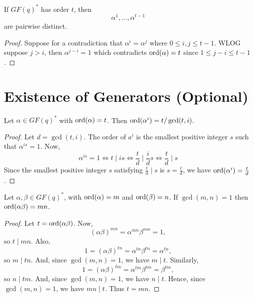 
\begin{thmbox}
    \begin{theorem}
        If $ GF(q)^* $ has order $ t $, then
        \[ \alpha^1,\ldots,\alpha^{t-1} \]
        are pairwise distinct.
    \end{theorem}
\end{thmbox}

\begin{proof}
    Suppose for a contradiction that $ \alpha^i=\alpha^j $ where $ 0\leqslant i,j\leqslant t-1 $.
    WLOG suppose $ j>i $, then $ \alpha^{j-i}=1 $ which contradicts $ \operatorname{ord}(\alpha)=t $
    since $ 1\leqslant j-i\leqslant t-1 $.
\end{proof}

\section{Existence of Generators (Optional)}

\begin{thmbox}
    \begin{lemma}
        Let $ \alpha\in GF(q)^* $ with $ \operatorname{ord}(\alpha)=t $. Then $ \operatorname{ord}(\alpha^i)=
            t/\gcd(t,i) $.
    \end{lemma}
\end{thmbox}

\begin{proof}
    Let $ d=\gcd(t,i) $. The order of $ a^i $ is the smallest positive
    integer $ s $ such that $ \alpha^{is}=1 $. Now,
    \[ \alpha^{is}=1\iff t\mid is\iff \frac{t}{d}\mid \frac{i}{d}s
        \iff \frac{t}{d} \mid s \]
    Since the smallest positive integer $ s $ satisfying $ \frac{t}{d} \mid s $
    is $ s=\frac{t}{d} $, we have $ \operatorname{ord}(\alpha^i)=\frac{t}{d} $.
\end{proof}

\begin{thmbox}
    \begin{lemma}
        Let $ \alpha,\beta\in GF(q)^* $, with $ \operatorname{ord}(\alpha)=m $ and $ \operatorname{ord}(\beta)=n $.
        If $ \gcd(m,n)=1 $ then $ \operatorname{ord}(\alpha\beta)=mn $.
    \end{lemma}
\end{thmbox}
\begin{proof}
    Let $ t=\operatorname{ord}(\alpha\beta) $. Now,
    \[ (\alpha\beta)^{mn}=\alpha^{mn}\beta^{mn}=1, \]
    so $ t\mid mn $. Also,
    \[ 1=(\alpha\beta)^{tn}=\alpha^{tn}\beta^{tn}=\alpha^{tn}, \]
    so $ m\mid tn $. And, since $ \gcd(m,n)=1 $, we have $ m\mid t $. Similarly,
    \[ 1=(\alpha\beta)^{tm}=\alpha^{tm}\beta^{tm}=\beta^{tm}, \]
    so $ n\mid tm $. And, since $ \gcd(m,n)=1 $, we have $ n\mid t $. Hence, since $ \gcd(m,n)=1 $,
    we have $ mn\mid t $. Thus $ t=mn $.
\end{proof}

